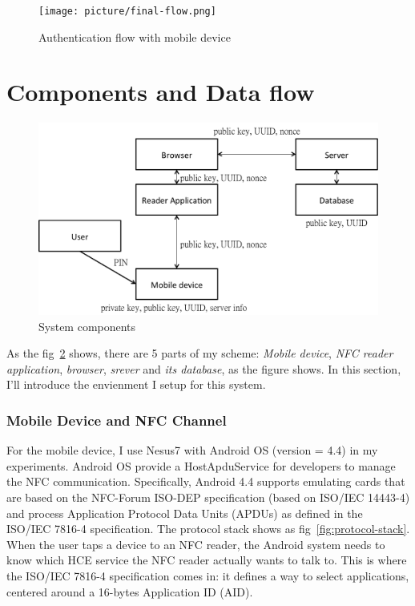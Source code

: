 \begin{CJK}{Bg5}{bsmi}
\begin{figure}
\centering
\texttt{[image: picture/final-flow.png]}
\caption{Authentication flow with mobile device}
\label{fig:final-flow}
\end{figure}

\section{Components and Data flow}

\begin{figure}
\centering
\includegraphics[scale=0.45]{picture/system-component.png}
\caption{System components}
\label{fig:system-component}
\end{figure}

As the fig~\ref{fig:system-component} shows, there are 5 parts of my scheme: \emph{Mobile device}, \emph{NFC reader application}, \emph{browser}, \emph{srever} and \emph{its database}, as the figure shows. In this section, I'll introduce the envienment I setup for this system.

\subsubsection{Mobile Device and NFC Channel}

For the mobile device, I use Nesus7 with Android OS (version = 4.4) in my experiments. Android OS provide a HostApduService for developers to manage the NFC communication. Specifically, Android 4.4 supports emulating cards that are based on the NFC-Forum ISO-DEP specification (based on ISO/IEC 14443-4) and process Application Protocol Data Units (APDUs) as defined in the ISO/IEC 7816-4 specification. The protocol stack shows as fig~\ref{fig:protocol-stack}. When the user taps a device to an NFC reader, the Android system needs to know which HCE service the NFC reader actually wants to talk to. This is where the ISO/IEC 7816-4 specification comes in: it defines a way to select applications, centered around a 16-bytes Application ID (AID).


\end{CJK}

